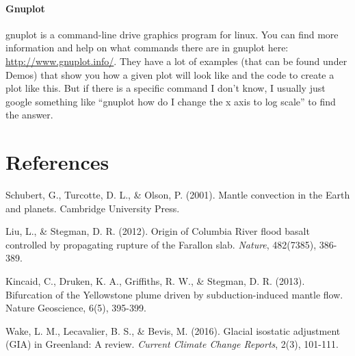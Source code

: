 \documentclass[notitlepage]{article}
\begin{document}
\paragraph{Gnuplot}
gnuplot is a command-line drive graphics program for linux. 
You can find more information and help on what commands there are in gnuplot here: \url{http://www.gnuplot.info/}. They have a lot of examples (that can be found under Demos) that show you how a given plot will look like and the code to create a plot like this. 
But if there is a specific command I don't know, I usually just google something like ``gnuplot how do I change the x axis to log scale'' to find the answer. 

\section*{References}
Schubert, G., Turcotte, D. L., \& Olson, P. (2001). Mantle convection in the Earth and planets. Cambridge University Press.

Liu, L., \& Stegman, D. R. (2012). Origin of Columbia River flood basalt controlled by propagating rupture of the Farallon slab. \textit{Nature}, 482(7385), 386-389.

Kincaid, C., Druken, K. A., Griffiths, R. W., \& Stegman, D. R. (2013). Bifurcation of the Yellowstone plume driven by subduction-induced mantle flow. Nature Geoscience, 6(5), 395-399.

Wake, L. M., Lecavalier, B. S., \& Bevis, M. (2016). Glacial isostatic adjustment (GIA) in Greenland: A review. \textit{Current Climate Change Reports}, 2(3), 101-111.
\end{document}
